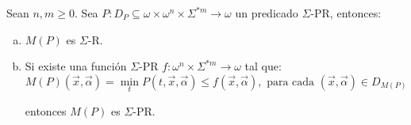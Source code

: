   \begin{lemma}
    \PN Sean $n, m \geq 0$. Sea $P: D_{P} \subseteq \omega \times \omega^{n} \times \Sigma^{\ast m} \rightarrow \omega$
    un predicado $\Sigma$-PR, entonces:

    \begin{enumerate}[a)]
      \item $M(P)$ es $\Sigma$-R.
      \item Si existe una función $\Sigma$-PR $f: \omega^{n} \times \Sigma^{\ast m} \rightarrow \omega$ tal que:
        \[
          M(P)(\vec{x},\vec{\alpha}) = \min_{t}P(t,\vec{x},\vec{\alpha}) \leq f(\vec{x},\vec{\alpha}),
          \text{ para cada }(\vec{x},\vec{\alpha}) \in D_{M(P)}
        \]

        \PN entonces $M(P)$ es $\Sigma$-PR.
    \end{enumerate}
  \end{lemma}
